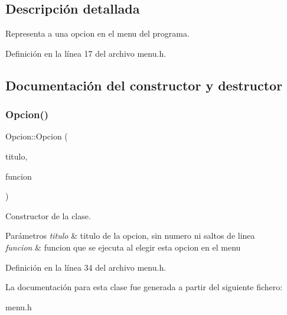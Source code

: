 \subsection{Descripción detallada}
Representa a una opcion en el menu del programa. 

Definición en la línea 17 del archivo menu.\+h.



\subsection{Documentación del constructor y destructor}
\mbox{\label{classOpcion_aca1ec1590d4a27e91615ec8af53d2824}} 
\subsubsection{\texorpdfstring{Opcion()}{Opcion()}}
{\footnotesize\ttfamily Opcion\+::\+Opcion (\begin{DoxyParamCaption}\item[{std\+::string}]{titulo,  }\item[{std\+::function$<$ bool(\hyperlink{classArbolAVL}{Arbol\+A\+VL} $\ast$a)$>$ $\ast$}]{funcion }\end{DoxyParamCaption})\hspace{0.3cm}{\ttfamily [inline]}}



Constructor de la clase. 


\begin{DoxyParams}{Parámetros}
{\em titulo} & titulo de la opcion, sin numero ni saltos de linea \\
\hline
{\em funcion} & funcion que se ejecuta al elegir esta opcion en el menu \\
\hline
\end{DoxyParams}


Definición en la línea 34 del archivo menu.\+h.



La documentación para esta clase fue generada a partir del siguiente fichero\+:\begin{DoxyCompactItemize}
\item 
menu.\+h\end{DoxyCompactItemize}
